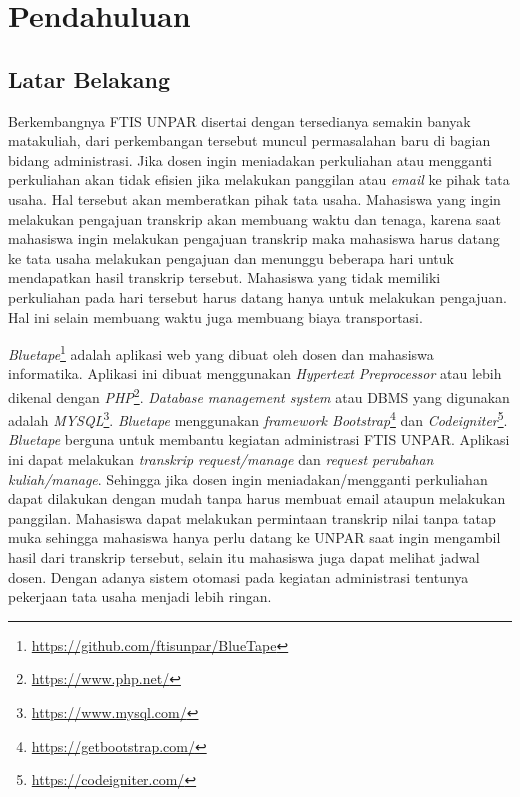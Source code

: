 \chapter{Pendahuluan}
\label{chap:intro}
   
\section{Latar Belakang}
\label{sec:label}
 Berkembangnya FTIS UNPAR disertai dengan tersedianya semakin banyak matakuliah, dari perkembangan tersebut muncul permasalahan baru di bagian bidang administrasi. Jika dosen ingin meniadakan perkuliahan atau mengganti perkuliahan akan tidak efisien jika melakukan panggilan atau \textit{email} ke pihak tata usaha. Hal tersebut akan memberatkan pihak tata usaha. Mahasiswa yang ingin melakukan pengajuan transkrip akan membuang waktu dan tenaga, karena saat mahasiswa ingin melakukan pengajuan transkrip maka mahasiswa harus datang ke tata usaha melakukan pengajuan dan menunggu beberapa hari untuk mendapatkan hasil transkrip tersebut. Mahasiswa yang tidak memiliki perkuliahan pada hari tersebut harus datang hanya untuk melakukan pengajuan. Hal ini selain membuang waktu juga membuang biaya transportasi.


\textit{Bluetape}\footnote{\label{ft:bluetape}\url{https://github.com/ftisunpar/BlueTape}} adalah aplikasi web yang dibuat oleh dosen dan mahasiswa informatika. Aplikasi ini dibuat menggunakan \textit{Hypertext Preprocessor} atau lebih dikenal dengan \textit{PHP}\footnote{\url{https://www.php.net/}}. \textit{Database management system} atau DBMS yang digunakan adalah \textit{MYSQL}\footnote{\url{https://www.mysql.com/}}.\textit{ Bluetape} menggunakan \textit{framework Bootstrap}\footnote{\url{https://getbootstrap.com/}} dan \textit{Codeigniter}\footnote{\url{https://codeigniter.com/}}. \textit{Bluetape} berguna untuk membantu kegiatan administrasi FTIS UNPAR. Aplikasi ini dapat melakukan \textit{transkrip request/manage} dan \textit{request perubahan kuliah/manage}. Sehingga jika dosen ingin meniadakan/mengganti perkuliahan dapat dilakukan dengan mudah tanpa harus membuat email ataupun melakukan panggilan. Mahasiswa dapat melakukan permintaan transkrip nilai tanpa tatap muka sehingga mahasiswa hanya perlu datang ke UNPAR saat ingin mengambil hasil dari transkrip tersebut, selain itu mahasiswa juga dapat melihat jadwal dosen. Dengan adanya sistem otomasi pada kegiatan administrasi tentunya pekerjaan tata usaha menjadi lebih ringan. 


